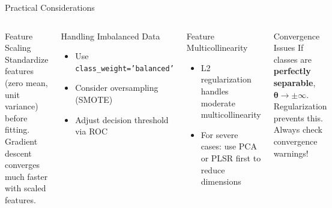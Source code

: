 \documentclass[aspectratio=169,11pt]{beamer}
\begin{document}
\begin{frame}{Practical Considerations}
\begin{columns}[T]
\begin{block}{Feature Scaling}
Standardize features (zero mean, unit variance) before fitting. Gradient descent converges much faster with scaled features.
\end{block}

\vspace{0.3em}
\begin{block}{Handling Imbalanced Data}
\begin{itemize}
  \item Use \texttt{class\_weight='balanced'}
  \item Consider oversampling (SMOTE)
  \item Adjust decision threshold via ROC
\end{itemize}
\end{block}

\begin{block}{Feature Multicollinearity}
\begin{itemize}
  \item L2 regularization handles moderate multicollinearity
  \item For severe cases: use PCA or PLSR first to reduce dimensions
\end{itemize}
\end{block}

\vspace{0.3em}
\begin{alertblock}{Convergence Issues}
If classes are \textbf{perfectly separable}, $\boldsymbol{\theta}\to\pm\infty$. Regularization prevents this. Always check convergence warnings!
\end{alertblock}
\end{columns}
\end{frame}
\end{document}
